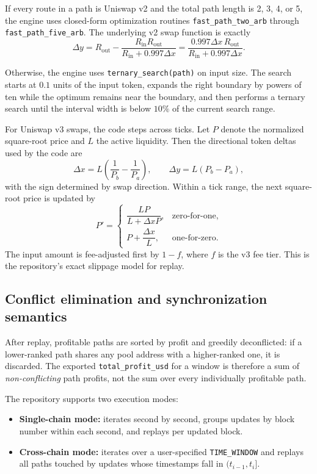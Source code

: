 \documentclass[11pt]{article}
\begin{document}
If every route in a path is Uniswap v2 and the total path length is 2, 3, 4, or 5, the engine uses closed-form optimization routines \texttt{fast\_path\_two\_arb} through \texttt{fast\_path\_five\_arb}. The underlying v2 swap function is exactly
\[
\Delta y
=
R_{\text{out}} - \frac{R_{\text{in}}R_{\text{out}}}{R_{\text{in}} + 0.997 \Delta x}
=
\frac{0.997 \Delta x \, R_{\text{out}}}{R_{\text{in}} + 0.997 \Delta x}.
\]

Otherwise, the engine uses \texttt{ternary\_search(path)} on input size. The search starts at \(0.1\) units of the input token, expands the right boundary by powers of ten while the optimum remains near the boundary, and then performs a ternary search until the interval width is below \(10\%\) of the current search range.

For Uniswap v3 swaps, the code steps across ticks. Let \(P\) denote the normalized square-root price and \(L\) the active liquidity. Then the directional token deltas used by the code are
\[
\Delta x = L\left(\frac{1}{P_b} - \frac{1}{P_a}\right),
\qquad
\Delta y = L(P_b - P_a),
\]
with the sign determined by swap direction. Within a tick range, the next square-root price is updated by
\[
P' =
\begin{cases}
\dfrac{LP}{L + \Delta x P}, & \text{zero-for-one},\\[0.8em]
P + \dfrac{\Delta x}{L}, & \text{one-for-zero}.
\end{cases}
\]
The input amount is fee-adjusted first by \(1-f\), where \(f\) is the v3 fee tier. This is the repository's exact slippage model for replay.

\subsection{Conflict elimination and synchronization semantics}

After replay, profitable paths are sorted by profit and greedily deconflicted: if a lower-ranked path shares any pool address with a higher-ranked one, it is discarded. The exported \texttt{total\_profit\_usd} for a window is therefore a sum of \emph{non-conflicting} path profits, not the sum over every individually profitable path.

The repository supports two execution modes:
\begin{itemize}[leftmargin=1.5em]
    \item \textbf{Single-chain mode:} iterates second by second, groups updates by block number within each second, and replays per updated block.
    \item \textbf{Cross-chain mode:} iterates over a user-specified \texttt{TIME\_WINDOW} and replays all paths touched by updates whose timestamps fall in \((t_{i-1}, t_i]\).
\end{itemize}
\end{document}
